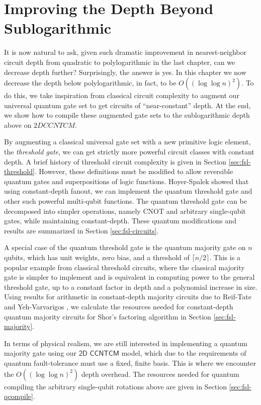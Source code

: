 \section{Improving the Depth Beyond Sublogarithmic}
\label{fsl-intro}

It is now natural to ask, given such dramatic improvement in
nearest-neighbor circuit
depth from quadratic \cite{Kutin2006} to polylogarithmic in the last chapter, can we
decrease depth further? Surprisingly, the answer is yes. In this
chapter we now decrease the depth below polylogarithmic, in fact,
to be $O((\log \log n)^2)$. To do this, we take inspiration from
classical circuit complexity to augment our universal quantum gate
set to get circuits of ``near-constant'' depth. At the end, we show how
to compile these augmented gate sets to the sublogarithmic depth above
on $2D CCNTCM$.

By augmenting a classical universal
gate set with a new primitive logic element, the \emph{threshold gate}, we can
get strictly more powerful circuit classes with constant depth. A brief
history of threshold circuit complexity is given in Section \ref{sec:fsl-threshold}.
However, these
definitions must be modified to allow reversible quantum gates and
superpositions of logic functions. Hoyer-Spalek showed that using
constant-depth fanout, we can implement the quantum threshold gate and
other such powerful multi-qubit functions.
The quantum threshold
gate can be decomposed into simpler operations, namely CNOT and
arbitrary single-qubit gates, while maintaining constant-depth.
These quantum modifications and results
are summarized in Section \ref{sec:fsl-circuits}.

A special case of the quantum threshold gate is the quantum majority
gate on $n$ qubits, which has unit weights, zero bias, and a
threshold of $\lceil n/2 \rceil$. This is a popular example from
classical threshold circuits, where the classical majority gate
is simpler to implement and is equivalent in computing power to
the general threshold gate, up to a constant factor in depth and
a polynomial increase in size. Using results for
arithmetic in constant-depth majority circuits due to
Reif-Tate \cite{Reif1992} and Yeh-Varvarigos \cite{Yeh1996},
we calculate the resources needed
for constant-depth quantum majority circuits for Shor's factoring
algorithm in Section \ref{sec:fsl-majority}.

In terms of physical realism,
we are still interested in implementing a quantum majority gate using
our $\textsf{2D CCNTCM}$ model, which due to the requirements of
quantum fault-tolerance must use a fixed, finite basis. This is where
we encounter the $O((\log \log n)^2)$ depth overhead. The resources
needed for quantum compiling the arbitrary single-qubit rotations above
are given in Section \ref{sec:fsl-qcompile}.
